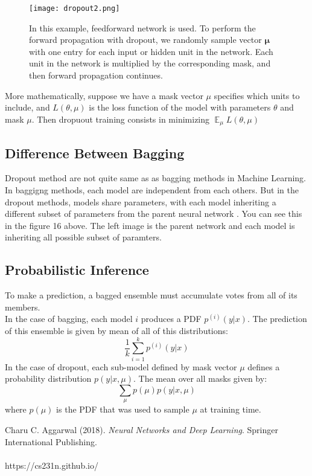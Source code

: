 \documentclass[11pt]{article}
\DeclareMathOperator{\EX}{\mathbb{E}}
\begin{document}
\begin{figure}[H]
\centering
\texttt{[image: dropout2.png]}
\caption{In this example, feedforward network is used. To perform the forward propagation with dropout, we randomly sample vector $\mathbf{\mu}$ with one entry for each input or hidden unit in the network. Each unit in the network is multiplied by the corresponding mask, and then forward propagation continues.}
\label{fig:figure3}
\end{figure}
More mathematically, suppose we have a mask vector $\mu$ specifies which units to include, and $L(\theta,\mu)$ is the loss function of the model with parameters $\theta$ and mask $\mu$. Then dropuout training consists in minimizing $\EX_\mu L(\theta,\mu)$ \cite{GoodBengCour16}
\subsection{Difference Between Bagging}
\hspace*{1cm} Dropout method are not quite same as as bagging methods in Machine Learning. In baggigng methods, each model are independent from each others. But in the dropout methods, models share parameters, with each model inheriting a different subset of parameters from the parent neural network \cite{GoodBengCour16}. You can see this in the figure 16 above. The left image is the parent network and each model is inheriting all possible subset of paramters.
\subsection{Probabilistic Inference}
\hspace*{1cm}To make a prediction, a bagged ensemble must accumulate votes from all of its members.\\
In the case of bagging, each model $i$ produces a PDF $p^{(i)}(y|x)$. The prediction of this ensemble is given by mean of all of this distributions:
$$\frac{1}{k}\sum_{i=1}^kp^{(i)}(y|x)$$
In the case of dropout, each sub-model defined by mask vector $\mu$ defines a probability distribution $p(y|x,\mu)$. The mean over all masks given by:
$$\sum_{\mu}p(\mu)p(y|x,\mu)$$ 
where $p(\mu)$ is the PDF that was used to sample $\mu$ at training time. 


Charu C. Aggarwal (2018). \textit{Neural Networks and Deep Learning}. Springer International Publishing.\\\\
https://cs231n.github.io/
\end{document}
